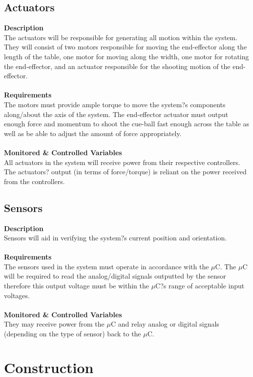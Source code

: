 \documentclass[titlepage]{article}
\begin{document}
\subsection{Actuators}
\textbf{Description}\\
The actuators will be responsible for generating all motion within the system. They will consist of two motors responsible for moving the end-effector along the length of the table, one motor for moving along the width, one motor for rotating the end-effector, and an actuator responsible for the shooting motion of the end-effector.\\~\\
\textbf{Requirements}\\
The motors must provide ample torque to move the system?s components along/about the axis of the system. The end-effector actuator must output enough force and momentum to shoot the cue-ball fast enough across the table as well as be able to adjust the amount of force appropriately.\\~\\
\noindent\textbf{Monitored \& Controlled Variables}\\
All actuators in the system will receive power from their respective controllers. The actuators? output (in terms of force/torque) is reliant on the power received from the controllers.

\subsection{Sensors}
\textbf{Description}\\
Sensors will aid in verifying the system?s current position and orientation.\\~\\
\textbf{Requirements}\\
The sensors used in the system must operate in accordance with the $\mu$C. The $\mu$C will be required to read the analog/digital signals outputted by the sensor therefore this output voltage must be within the $\mu$C?s range of acceptable input voltages.\\~\\
\textbf{Monitored \& Controlled Variables}\\
They may receive power from the $\mu$C and relay analog or digital signals (depending on the type of sensor) back to the $\mu$C.



\section{Construction}
\end{document}
